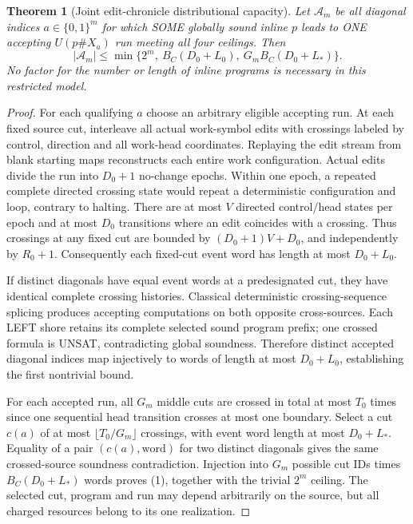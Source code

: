 \documentclass[11pt]{article}
\newtheorem{theorem}{Theorem}
\begin{document}
\begin{theorem}[Joint edit-chronicle distributional capacity]\label{th:density}
Let $\mathcal A_m$ be all diagonal indices $a\in\{0,1\}^m$ for which SOME globally sound inline $p$ leads to ONE accepting $U(p\#X_a)$ run meeting all four ceilings. Then
\[
 \boxed{|\mathcal A_m|\le
 \min\{2^m,\ B_C(D_0+L_0),\
             G_m B_C(D_0+L_*)\}.}\tag{1}
\]
No factor for the number or length of inline programs is necessary in this restricted model.
\end{theorem}

\begin{proof}
For each qualifying $a$ choose an arbitrary eligible accepting run. At each fixed source cut, interleave all actual work-symbol edits with crossings labeled by control, direction and all work-head coordinates. Replaying the edit stream from blank starting maps reconstructs each entire work configuration. Actual edits divide the run into $D_0+1$ no-change epochs. Within one epoch, a repeated complete directed crossing state would repeat a deterministic configuration and loop, contrary to halting. There are at most $V$ directed control/head states per epoch and at most $D_0$ transitions where an edit coincides with a crossing. Thus crossings at any fixed cut are bounded by $(D_0+1)V+D_0$, and independently by $R_0+1$. Consequently each fixed-cut event word has length at most $D_0+L_0$.

If distinct diagonals have equal event words at a predesignated cut, they have identical complete crossing histories. Classical deterministic crossing-sequence splicing produces accepting computations on both opposite cross-sources. Each LEFT shore retains its complete selected sound program prefix; one crossed formula is UNSAT, contradicting global soundness. Therefore distinct accepted diagonal indices map injectively to words of length at most $D_0+L_0$, establishing the first nontrivial bound.

For each accepted run, all $G_m$ middle cuts are crossed in total at most $T_0$ times since one sequential head transition crosses at most one boundary. Select a cut $c(a)$ of at most $\lfloor T_0/G_m\rfloor$ crossings, with event word length at most $D_0+L_*$. Equality of a pair $(c(a),\mathrm{word})$ for two distinct diagonals gives the same crossed-source soundness contradiction. Injection into $G_m$ possible cut IDs times $B_C(D_0+L_*)$ words proves (1), together with the trivial $2^m$ ceiling. The selected cut, program and run may depend arbitrarily on the source, but all charged resources belong to its one realization.
\end{proof}
\end{document}

